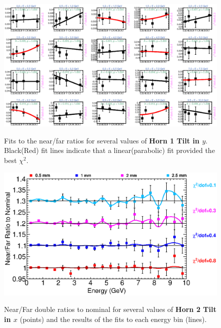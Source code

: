 {\begin{figure}[ht]
  \begin{center}
    {\includegraphics[width=5.0in]{figures/Horn1YTilt_nof_fits.eps}}
  \end{center}
\caption{ Fits to the near/far ratios for several values of {\bf Horn 1 Tilt in $y$}. Black(Red) fit lines indicate that a linear(parabolic) fit provided the best $\chi^2$. }
\end{figure}



\begin{figure}[ht]
  \begin{center}
    {\includegraphics[width=6.0in]{figures/Horn2XTilt_nof_summary.eps}}
  \end{center}
\caption{ Near/Far double ratios to nominal for several values of {\bf Horn 2 Tilt in $x$} (points) and the results of the fits to each energy bin (lines).}
\end{figure}

}
